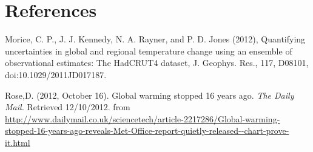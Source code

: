 \documentclass{article}\usepackage{graphicx, color}
\begin{document}
\section{References}
Morice, C. P., J. J. Kennedy, N. A. Rayner, and P. D. Jones (2012), Quantifying uncertainties in global and regional temperature change using an ensemble of observational estimates: The HadCRUT4 dataset, J. Geophys. Res., 117, D08101, doi:10.1029/2011JD017187.

Rose,D. (2012, October 16). Global warming stopped 16 years ago. \emph{The Daily Mail.} Retrieved 12/10/2012. from \url{http://www.dailymail.co.uk/sciencetech/article-2217286/Global-warming-stopped-16-years-ago-reveals-Met-Office-report-quietly-released--chart-prove-it.html}
\end{document}
